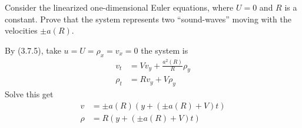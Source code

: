 \exc Consider the linearized one-dimensional 
Euler equations, where $U = 0$
and $R$ is a constant.
 Prove that the system represents two “sound-waves”
moving with the velocities $±a(R)$.


\begin{solution}
    By (3.7.5), take $u = U = \rho_x = v_x = 0$ the system is 
    \begin{align*}
      v_t &= V v_y +\frac{a^2(R)}{R} \rho_y \\
      \rho_t &= R v_y + V \rho_y
    \end{align*}
    Solve this get 
    \begin{align*}
      v &= \pm a(R)(y + (\pm a(R) + V)t) \\
      \rho &= R(y + (\pm a(R) + V)t)
    \end{align*}
\end{solution}